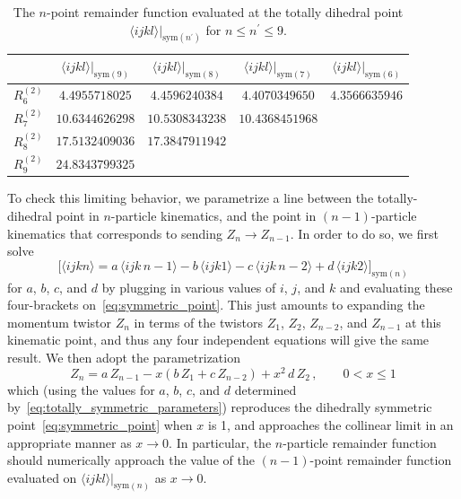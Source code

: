 \documentclass[11pt]{article}
\begin{document}
\begin{table}[!t]
\begin{center}
\renewcommand{\arraystretch}{1.2}
\begin{tabular}{| l || c | c | c | c |}
\hline
\ & $\langle i j k l \rangle \big|_{\text{sym}(9)}$ & $\langle i j k l \rangle \big|_{\text{sym}(8)}$ & $\langle i j k l \rangle \big|_{\text{sym}(7)}$ & $\langle i j k l \rangle \big|_{\text{sym}(6)}$ \\[.12cm]
\hline\hline
$R^{(2)}_6$  & $4.4955718025$ & $4.4596240384$ & $4.4070349650$ & $4.3566635946$  \\
$R^{(2)}_7$  & $10.6344626298$ & $10.5308343238$  & $10.4368451968$ & \ \\
$R^{(2)}_8$  & $17.5132409036$ & $17.3847911942$  & \  & \ \\
$R^{(2)}_9$  & $24.8343799325$ & \  & \  & \ \\
\hline
\end{tabular}
\caption{The $n$-point remainder function evaluated at the totally dihedral point $\langle i j k l \rangle \big|_{\text{sym}(n^\prime)}$ for $n \leq n^\prime \leq 9$.}
\label{table:symmetric_point_numerics}
\end{center}
\end{table}

To check this limiting behavior, we parametrize a line between the totally-dihedral point in $n$-particle kinematics, and the point in $(n{-}1)$-particle kinematics that corresponds to sending $Z_n \to Z_{n-1}$. In order to do so, we first solve
\begin{equation} \label{eq:totally_symmetric_parameters}
\Big[ \langle i j k n \rangle = a\, \langle i j k \, n{-}1 \rangle - b\, \langle i  j  k 1 \rangle - c\, \langle i j k \, n{-}2 \rangle + d\, \langle i j k 2 \rangle \Big]_{\text{sym}(n)} 
\end{equation}
for $a$, $b$, $c$, and $d$ by plugging in various values of $i$, $j$, and $k$ and evaluating these four-brackets on~\eqref{eq:symmetric_point}. This just amounts to expanding the momentum twistor $Z_n$ in terms of the twistors $Z_1$, $Z_2$, $Z_{n-2}$, and $Z_{n-1}$ at this kinematic point, and thus any four independent equations will give the same result. We then adopt the parametrization
\begin{equation} \label{eq:line_parametrization}
Z_n = a\, Z_{n-1} - x (b\, Z_1 + c\, Z_{n-2}) + x^2 \, d \, Z_2 \, , \qquad 0 < x \leq 1
\end{equation}
which (using the values for $a$, $b$, $c$, and $d$ determined by~\eqref{eq:totally_symmetric_parameters}) reproduces the dihedrally symmetric point~\eqref{eq:symmetric_point} when $x$ is 1, and approaches the collinear limit in an appropriate manner as $x \to 0$. In particular, the $n$-particle remainder function should numerically approach the value of the $(n{-}1)$-point remainder function evaluated on $\langle i j k l \rangle \big|_{\text{sym}(n)}$ as $x \to 0$.
\end{document}
